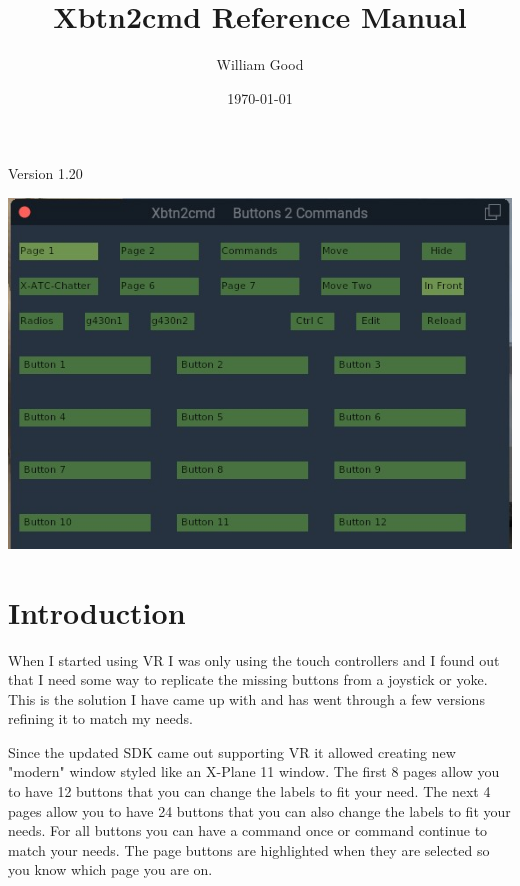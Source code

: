 \documentclass[11pt,parskip=half,a4paper]{scrartcl}
\begin{document}
\title{Xbtn2cmd Reference Manual}
\author{William Good}
\date{\today}
\maketitle

\begin{center}
Version 1.20
\end{center}

\begin{center}
\includegraphics[width=15cm]{../pics/Xbtn2cmd_Page1.jpg}
\end{center}



\thispagestyle{empty}
\newpage
\verb||
\tableofcontents

\newpage
\section{Introduction}

When I started using VR I was only using the touch controllers and I found out that I need some way to replicate the missing buttons from a joystick or yoke. This is the solution I have came up with and has went through a few versions refining it to match my needs. \newline

Since the updated SDK came out supporting VR it allowed creating new "modern" window styled like an X-Plane 11 window. The first 8 pages allow you to have 12 buttons that you can change the labels to fit your need. The next 4 pages allow you to have 24 buttons that you can also change the labels to fit your needs. For all buttons you can have a command once or command continue to match your needs. The page buttons are highlighted when they are selected so you know which page you are on. 
\end{document}
